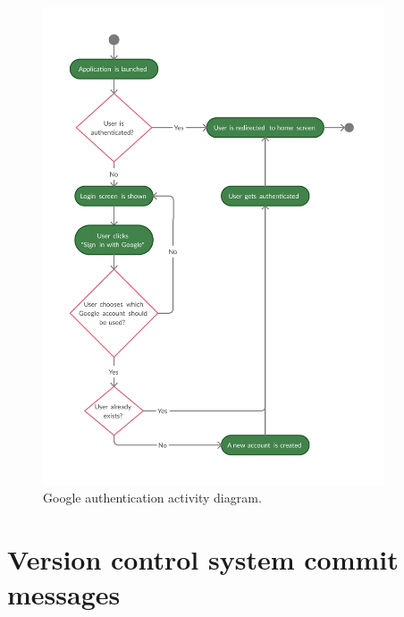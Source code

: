 \documentclass[
  digital, %
  table,   %
  oneside, %
  lof,     %
  lot,     %
]{fithesis3}
\begin{document}
    \newpage
    \begin{figure}[H]
        \begin{center}
            \includegraphics[width=0.9\textwidth]{figures/diagrams/google_auth_flow}
        \end{center}
        \caption{Google authentication activity diagram.}
        \label{fig:google_auth_flow}
    \end{figure}
    
\newpage
\section{Version control system commit messages}
\end{document}

